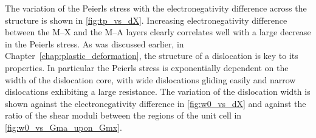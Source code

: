 The variation of the Peierls stress with the electronegativity difference across the structure is shown in \autoref{fig:tp_vs_dX}. Increasing electronegativity difference between the M--X and the M--A layers clearly correlates well with a large decrease in the Peierls stress. As was discussed earlier, in Chapter~\ref{chap:plastic_deformation}, the structure of a dislocation is key to its properties. In particular the Peierls stress is exponentially dependent on the width of the dislocation core, with wide dislocations gliding easily and narrow dislocations exhibiting a large resistance. The variation of the dislocation width is shown against the electronegativity difference in \autoref{fig:w0_vs_dX} and against the ratio of the shear moduli between the regions of the unit cell in \autoref{fig:w0_vs_Gma_upon_Gmx}.





